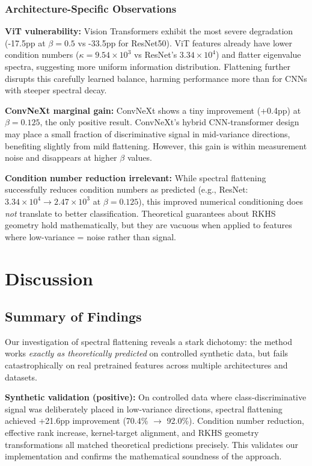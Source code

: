 \documentclass[11pt]{article}
\begin{document}
\subsubsection{Architecture-Specific Observations}

\textbf{ViT vulnerability:} Vision Transformers exhibit the most severe degradation (-17.5pp at $\beta=0.5$ vs -33.5pp for ResNet50). ViT features already have lower condition numbers ($\kappa = 9.54 \times 10^3$ vs ResNet's $3.34 \times 10^4$) and flatter eigenvalue spectra, suggesting more uniform information distribution. Flattening further disrupts this carefully learned balance, harming performance more than for CNNs with steeper spectral decay.

\textbf{ConvNeXt marginal gain:} ConvNeXt shows a tiny improvement (+0.4pp) at $\beta=0.125$, the only positive result. ConvNeXt's hybrid CNN-transformer design may place a small fraction of discriminative signal in mid-variance directions, benefiting slightly from mild flattening. However, this gain is within measurement noise and disappears at higher $\beta$ values.

\textbf{Condition number reduction irrelevant:} While spectral flattening successfully reduces condition numbers as predicted (e.g., ResNet: $3.34 \times 10^4 \to 2.47 \times 10^3$ at $\beta=0.125$), this improved numerical conditioning does \emph{not} translate to better classification. Theoretical guarantees about RKHS geometry hold mathematically, but they are vacuous when applied to features where low-variance = noise rather than signal.

\section{Discussion}

\subsection{Summary of Findings}

Our investigation of spectral flattening reveals a stark dichotomy: the method works \emph{exactly as theoretically predicted} on controlled synthetic data, but fails catastrophically on real pretrained features across multiple architectures and datasets.

\textbf{Synthetic validation (positive):} On controlled data where class-discriminative signal was deliberately placed in low-variance directions, spectral flattening achieved +21.6pp improvement (70.4\% $\to$ 92.0\%). Condition number reduction, effective rank increase, kernel-target alignment, and RKHS geometry transformations all matched theoretical predictions precisely. This validates our implementation and confirms the mathematical soundness of the approach.
\end{document}
